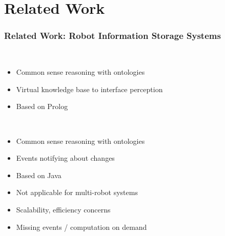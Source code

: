 \section{Related Work}
\begin{frame}
  \frametitle{Related Work: Robot Information Storage Systems}
  \begin{description}[]
  \item[KnowRob~\cite{KnowRob}]%
    \hfill \\
    \begin{itemize}
    \item Common sense reasoning with ontologies
    \item Virtual knowledge base to interface perception
    \item Based on Prolog
    \end{itemize}
  \end{description}
  \begin{description}[]
  \item[OpenRobots Ontology~\cite{Oro}]%
    \hfill \\
    \begin{itemize}
    \item Common sense reasoning with ontologies
    \item Events notifying about changes
    \item Based on  Java
    \end{itemize}
  \end{description}
  \begin{block}{}%
  \begin{itemize}
  \item Not applicable for multi-robot systems
  \item Scalability, efficiency concerns %
  \item Missing events / computation on demand
  \end{itemize}
  \end{block}
\end{frame}

